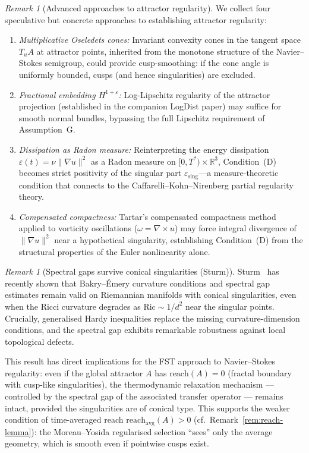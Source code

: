\documentclass[12pt,a4paper]{article}
\theoremstyle{definition}
\theoremstyle{plain}
\theoremstyle{remark}
\newtheorem{remark}[definition]{Remark}
\begin{document}
\begin{remark}[Advanced approaches to attractor regularity]
\label{rem:advanced-attractor}
We collect four speculative but concrete approaches to establishing attractor regularity:
\begin{enumerate}
\item \emph{Multiplicative Oseledets cones:} Invariant convexity cones in the tangent space $T_u A$ at attractor points, inherited from the monotone structure of the Navier--Stokes semigroup, could provide cusp-smoothing: if the cone angle is uniformly bounded, cusps (and hence singularities) are excluded.
\item \emph{Fractional embedding $H^{1+\varepsilon}$:} Log-Lipschitz regularity of the attractor projection (established in the companion LogDist paper) may suffice for smooth normal bundles, bypassing the full Lipschitz requirement of Assumption~G.
\item \emph{Dissipation as Radon measure:} Reinterpreting the energy dissipation $\varepsilon(t) = \nu \|\nabla u\|^2$ as a Radon measure on $[0, T^*) \times \mathbb{R}^3$, Condition~(D) becomes strict positivity of the singular part $\varepsilon_{\mathrm{sing}}$---a measure-theoretic condition that connects to the Caffarelli--Kohn--Nirenberg partial regularity theory.
\item \emph{Compensated compactness:} Tartar's compensated compactness method applied to vorticity oscillations ($\omega = \nabla \times u$) may force integral divergence of $\|\nabla u\|^2$ near a hypothetical singularity, establishing Condition~(D) from the structural properties of the Euler nonlinearity alone.
\end{enumerate}
\end{remark}

\begin{remark}[Spectral gaps survive conical singularities (Sturm)]
\label{rem:sturm-conical}
Sturm~\cite{Sturm2025} has recently shown that Bakry--\'Emery curvature conditions and spectral gap estimates remain valid on Riemannian manifolds with conical singularities, even when the Ricci curvature degrades as $\mathrm{Ric} \sim 1/d^2$ near the singular points. Crucially, generalised Hardy inequalities replace the missing curvature-dimension conditions, and the spectral gap exhibits remarkable robustness against local topological defects.

This result has direct implications for the FST approach to Navier--Stokes regularity: even if the global attractor $A$ has $\mathrm{reach}(A) = 0$ (fractal boundary with cusp-like singularities), the thermodynamic relaxation mechanism --- controlled by the spectral gap of the associated transfer operator --- remains intact, provided the singularities are of conical type. This supports the weaker condition of time-averaged reach $\mathrm{reach}_{\mathrm{avg}}(A) > 0$ (cf.\ Remark~\ref{rem:reach-lemma}): the Moreau--Yosida regularised selection ``sees'' only the average geometry, which is smooth even if pointwise cusps exist.
\end{remark}
\end{document}
